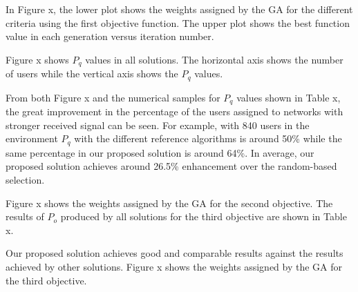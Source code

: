 In Figure x,
	the lower plot shows the weights assigned by the GA for the different criteria using the first objective function.
The upper plot shows the best function value in each generation versus iteration number.

Figure x shows $P_{q}$ values in all solutions.
The horizontal axis shows the number of users while the vertical axis shows the $P_{q}$ values.

From both Figure x and the numerical samples for $P_{q}$ values shown in Table x,
	the great improvement in the percentage of the users assigned to networks with stronger received signal can be seen.
For example,
	with 840 users in the environment $P_{q}$ with the different reference algorithms is around 50\% while the same percentage in our proposed solution is around 64\%.
In average,
	our proposed solution achieves around 26.5\% enhancement over the random-based selection.

Figure x shows the weights assigned by the GA for the second objective.
The results of $P_{o}$ produced by all solutions for the third objective are shown in Table x.

Our proposed solution achieves good and comparable results against the results achieved by other solutions.
Figure x shows the weights assigned by the GA for the third objective.


















